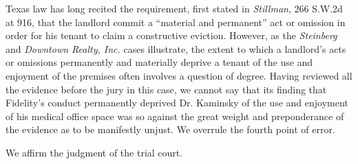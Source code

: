 Texas law has long recited the requirement, first stated in \textit{Stillman},
266 S.W.2d at 916, that the landlord commit a ``material and permanent'' act or
omission in order for his tenant to claim a constructive eviction. However, as
the \textit{Steinberg} and \textit{Downtown Realty, Inc.} cases illustrate, the
extent to which a landlord's acts or omissions permanently and materially
deprive a tenant of the use and enjoyment of the premises often involves a
question of degree. Having reviewed all the evidence before the jury in this
case, we cannot say that its finding that Fidelity's conduct permanently
deprived Dr. Kaminsky of the use and enjoyment of his medical office space was
so against the great weight and preponderance of the evidence as to be
manifestly unjust. We overrule the fourth point of error.

We affirm the judgment of the trial court.

